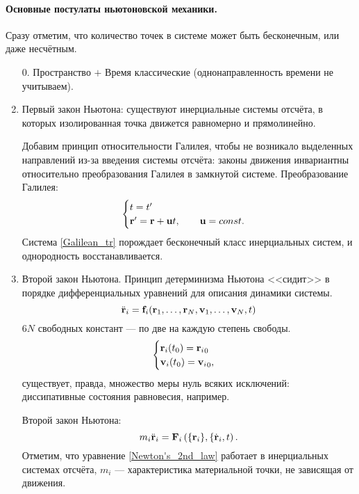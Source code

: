 \documentclass[12pt]{article}
\begin{document}
\paragraph{Основные постулаты ньютоновской механики.}
Сразу отметим, что количество точек в системе может быть бесконечным, или даже несчётным.

\begin{enumerate}
\item[0.] Пространство $+$ Время классические (однонаправленность времени не учитываем).
\item Первый закон Ньютона: существуют инерциальные системы отсчёта, в которых изолированная точка движется равномерно и прямолинейно.

Добавим принцип относительности Галилея, чтобы не возникало выделенных направлений из-за введения системы отсчёта: законы движения инвариантны относительно преобразования Галилея в замкнутой системе. Преобразование Галилея:
\begin{equation}
\begin{cases}
t = t'\\
\vb{r'} = \vb{r} + \vb{u}t, \qquad \vb{u} = const.
\end{cases}
\label{Galilean_tr}
\end{equation}
Система \eqref{Galilean_tr} порождает бесконечный класс инерциальных систем, и однородность восстанавливается.

\item Второй закон Ньютона. Принцип детерминизма Ньютона <<сидит>> в порядке дифференциальных уравнений для описания динамики системы.
\begin{equation*}
\Ddot{\vb{r}}_i = \vb{f}_i (\vb{r}_1, \dots, \vb{r}_N, \vb{v}_1, \dots, \vb{v}_N, t) 
\end{equation*}
$6N$ свободных констант --- по две на каждую степень свободы.
\begin{equation*}
\begin{cases}
\vb{r}_i (t_0) = {\vb{r}_i}_0\\
\vb{v}_i (t_0) = {\vb{v}_i}_0,
\end{cases}
\end{equation*}
существует, правда, множество меры нуль всяких исключений: диссипативные состояния равновесия, например.

Второй закон Ньютона:
\begin{equation}
m_i \ddot{\vb{r}}_i = \vb{F}_i \left(\{\vb{r}_i\}, \{\dot{\vb{r}}_i, t\right).
\label{Newton's_2nd_law}
\end{equation}
Отметим, что уравнение \eqref{Newton's_2nd_law} работает в инерциальных системах отсчёта, $m_i$ --- характеристика материальной точки, не зависящая от движения.


\end{enumerate}
\end{document}

